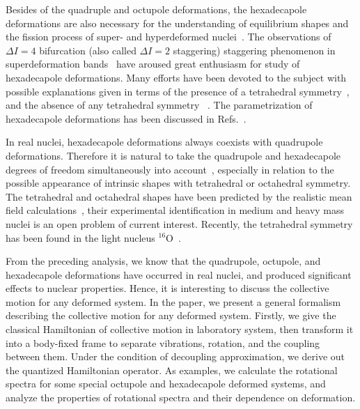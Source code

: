\documentclass[twocolumn,prc,showpacs,preprintnumbers,superscriptaddress,floatfix]{revtex4}
\begin{document}
Besides of the quadruple and octupole deformations, the hexadecapole
deformations are also necessary for the understanding of equilibrium shapes
and the fission process of super- and hyperdeformed nuclei~\cite%
{Aberg90,Dudek92}. The observations of $\Delta I=4$ bifurcation (also called
$\Delta I=2$ staggering) staggering phenomenon in superdeformation bands~%
\cite{Flibotte93,Cederwall94,Flibotte95,Semple96,Haslip97,Haslip982} have
aroused great enthusiasm for study of hexadecapole deformations. Many
efforts have been devoted to the subject with possible explanations given in
terms of the presence of a tetrahedral symmetry~\cite%
{Hamamoto94,Pavlichenkov95,Doenau96,Haslip981}, and the absence of any
tetrahedral symmetry~\cite%
{Guidry95,Heenen95,Luo95,Macchiavelli95,Magierski96,Mikhailov95,Pavlichenkov97,Reviol96,Toki97,Luo99}%
. The parametrization of hexadecapole deformations has been discussed in
Refs.~\cite{Nazarewicz81,Sobiczewski81,Rohozinski97}.

In real nuclei, hexadecapole deformations always coexists with quadrupole
deformations. Therefore it is natural to take the quadrupole and
hexadecapole degrees of freedom simultaneously into account~\cite%
{VanIsacker15}, especially in relation to the possible appearance of
intrinsic shapes with tetrahedral or octahedral symmetry. The tetrahedral
and octahedral shapes have been predicted by the realistic mean field
calculations~\cite{Dudek02,Dudek06}, their experimental identification in
medium and heavy mass nuclei is an open problem of current interest.
Recently, the tetrahedral symmetry has been found in the light nucleus $%
^{16} $O~\cite{Bijker14}.

From the preceding analysis, we know that the quadrupole, octupole, and
hexadecapole deformations have occurred in real nuclei, and produced
significant effects to nuclear properties. Hence, it is interesting to
discuss the collective motion for any deformed system. In the paper, we
present a general formalism describing the collective motion for any
deformed system. Firstly, we give the classical Hamiltonian of collective
motion in laboratory system, then transform it into a body-fixed frame to
separate vibrations, rotation, and the coupling between them. Under the
condition of decoupling approximation, we derive out the quantized
Hamiltonian operator. As examples, we calculate the rotational spectra for
some special octupole and hexadecapole deformed systems, and analyze the
properties of rotational spectra and their dependence on deformation.
\end{document}
